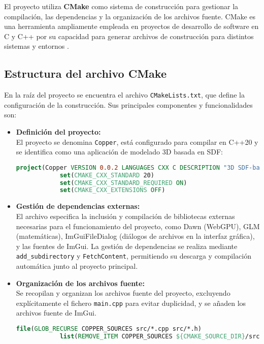 El proyecto utiliza \textbf{CMake} como sistema de construcción para gestionar
la compilación, las dependencias y la organización de los archivos fuente.
CMake es una herramienta ampliamente empleada en proyectos de desarrollo de
software en C y C++ por su capacidad para generar archivos de construcción para
distintos sistemas y entornos \cite{cmake-docs}.

\subsection{Estructura del archivo CMake}

En la raíz del proyecto se encuentra el archivo \texttt{CMakeLists.txt}, que
define la configuración de la construcción. Sus principales componentes y
funcionalidades son:

\begin{itemize}
    \item \textbf{Definición del proyecto:}\\
          El proyecto se denomina \texttt{Copper}, está configurado para compilar en C++20 y se identifica como una aplicación de modelado 3D basada en SDF:
          \begin{lstlisting}[language=CMake, caption={Definición del proyecto en CMakeLists.txt}]
            project(Copper VERSION 0.0.2 LANGUAGES CXX C DESCRIPTION "3D SDF-based modeling application")
            set(CMAKE_CXX_STANDARD 20)
            set(CMAKE_CXX_STANDARD_REQUIRED ON)
            set(CMAKE_CXX_EXTENSIONS OFF)
        \end{lstlisting}

    \item \textbf{Gestión de dependencias externas:}\\
          El archivo especifica la inclusión y compilación de bibliotecas externas necesarias para el funcionamiento del proyecto, como Dawn (WebGPU), GLM (matemáticas), ImGuiFileDialog (diálogos de archivos en la interfaz gráfica), y las fuentes de ImGui. La gestión de dependencias se realiza mediante \texttt{add\_subdirectory} y \texttt{FetchContent}, permitiendo su descarga y compilación automática junto al proyecto principal.

    \item \textbf{Organización de los archivos fuente:}\\
        Se recopilan y organizan los archivos fuente del proyecto, excluyendo explícitamente el fichero \texttt{main.cpp} para evitar duplicidad, y se añaden los archivos fuente de ImGui.
        \begin{lstlisting}[language=CMake, caption={Organización de los archivos fuente en CMakeLists.txt}]
            file(GLOB_RECURSE COPPER_SOURCES src/*.cpp src/*.h)
            list(REMOVE_ITEM COPPER_SOURCES ${CMAKE_SOURCE_DIR}/src/main.cpp)
        \end{lstlisting}


\end{itemize}
